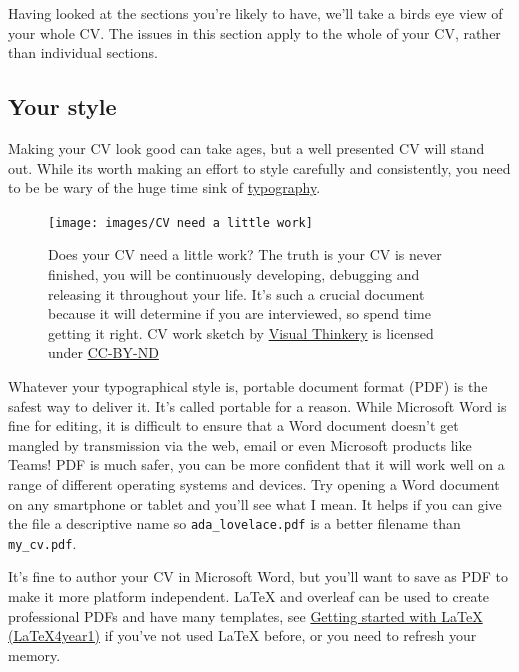 \documentclass[
]{book}
\begin{document}
Having looked at the sections you're likely to have, we'll take a birds eye view of your whole CV. The issues in this section apply to the whole of your CV, rather than individual sections.

\hypertarget{pdf}{%
\subsection{Your style}\label{pdf}}

Making your CV look good can take ages, but a well presented CV will stand out. While its worth making an effort to style carefully and consistently, you need to be be wary of the huge time sink of \href{https://en.wikipedia.org/wiki/Typography}{typography}.

\begin{figure}

{\centering \texttt{[image: images/CV need a little work]} 

}

\caption{Does your CV need a little work? The truth is your CV is never finished, you will be continuously developing, debugging and releasing it throughout your life. It's such a crucial document because it will determine if you are interviewed, so spend time getting it right. CV work sketch by \href{https://visualthinkery.com}{Visual Thinkery} is licensed under \href{https://creativecommons.org/licenses/by-nd/4.0/}{CC-BY-ND}}\label{fig:cvwork-fig}
\end{figure}



Whatever your typographical style is, portable document format (PDF) is the safest way to deliver it. It's called portable for a reason. While Microsoft Word is fine for editing, it is difficult to ensure that a Word document doesn't get mangled by transmission via the web, email or even Microsoft products like Teams! PDF is much safer, you can be more confident that it will work well on a range of different operating systems and devices. Try opening a Word document on any smartphone or tablet and you'll see what I mean. It helps if you can give the file a descriptive name so \texttt{ada\_lovelace.pdf} is a better filename than \texttt{my\_cv.pdf}.

It's fine to author your CV in Microsoft Word, but you'll want to save as PDF to make it more platform independent. LaTeX and overleaf can be used to create professional PDFs and have many templates, see \href{https://latex4year1.netlify.app/}{Getting started with LaTeX (LaTeX4year1)} if you've not used LaTeX before, or you need to refresh your memory. \citep{latex4year1}
\end{document}
